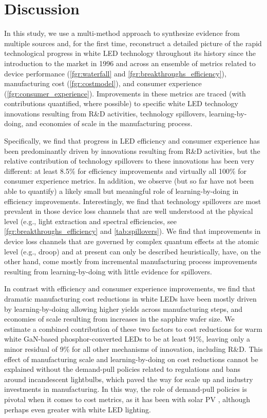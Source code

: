 \documentclass[parskip=full]{article}
\begin{document}
\clearpage
\section{Discussion}
\label{sec:discussion}

In this study, we use a multi-method approach to synthesize evidence from multiple sources and, for the first time, reconstruct a detailed picture of the rapid technological progress in white LED technology throughout its history since the introduction to the market in 1996 and across an ensemble of metrics related to device performance (\cref{fgr:waterfall} and \cref{fgr:breakthroughs_efficiency}), manufacturing cost (\cref{fgr:costmodel}), and consumer experience (\cref{fgr:consumer_experience}). Improvements in these metrics are traced (with contributions quantified, where possible) to specific white LED technology innovations resulting from R\&D activities, technology spillovers, learning-by-doing, and economies of scale in the manufacturing process. 

Specifically, we find that progress in LED efficiency and consumer experience has been predominantly driven by innovations resulting from R\&D activities, but the relative contribution of technology spillovers to these innovations has been very different: at least 8.5\% for efficiency improvements and virtually all 100\% for consumer experience metrics. In addition, we observe (but so far have not been able to quantify) a likely small but meaningful role of learning-by-doing in efficiency improvements. Interestingly, we find that technology spillovers are most prevalent in those device loss channels that are well understood at the physical level (e.g., light extraction and spectral efficiencies, see \cref{fgr:breakthroughs_efficiency} and \cref{tab:spillovers}). We find that improvements in device loss channels that are governed by complex quantum effects at the atomic level (e.g., droop) and at present can only be described heuristically, have, on the other hand, come mostly from incremental manufacturing process improvements resulting from learning-by-doing with little evidence for spillovers.

In contrast with efficiency and consumer experience improvements, we find that dramatic manufacturing cost reductions in white LEDs have been mostly driven by learning-by-doing allowing higher yields across manufacturing steps, and economies of scale resulting from increases in the sapphire wafer size. We estimate a combined contribution of these two factors to cost reductions for warm white GaN-based phosphor-converted LEDs to be at least 91\%, leaving only a minor residual of 9\% for all other mechanisms of innovation, including R\&D. This effect of manufacturing scale and learning-by-doing on cost reductions cannot be explained without the demand-pull policies related to regulations and bans around incandescent lightbulbs, which paved the way for scale up and industry investments in manufacturing. In this way, the role of demand-pull policies is pivotal when it comes to cost metrics, as it has been with solar PV \cite{nemet2019solar}, although perhaps even greater with white LED lighting. 
\end{document}
